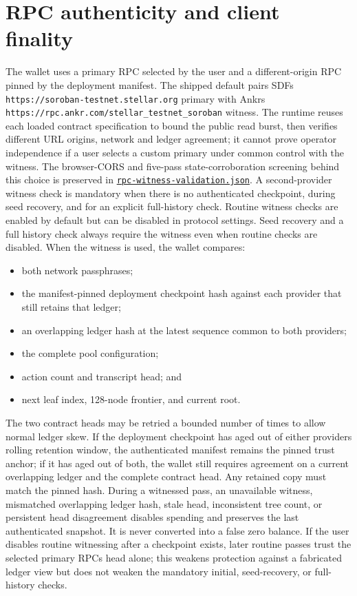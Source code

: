 \documentclass[11pt,letterpaper]{article}
\providecommand{\tightlist}{\setlength{\itemsep}{0pt}\setlength{\parskip}{0pt}}
\begin{document}
\section{RPC authenticity and client
finality}\label{rpc-authenticity-and-client-finality}

The wallet uses a primary RPC selected by the user and a
different-origin RPC pinned by the deployment manifest. The shipped
default pairs SDF\textquotesingle s
\texttt{https://soroban-testnet.stellar.org} primary with
Ankr\textquotesingle s
\texttt{https://rpc.ankr.com/stellar\_testnet\_soroban} witness. The
runtime reuses each loaded contract specification to bound the public
read burst, then verifies different URL origins, network and ledger
agreement; it cannot prove operator independence if a user selects a
custom primary under common control with the witness. The browser-CORS
and five-pass state-corroboration screening behind this choice is
preserved in
\href{https://github.com/stellarchain/io.stellarkey/blob/v1.1.2/protocol/private-balance/results/rpc-witness-validation.json}{\texttt{rpc-witness-validation.json}}.
A second-provider witness check is mandatory when there is no
authenticated checkpoint, during seed recovery, and for an explicit
full-history check. Routine witness checks are enabled by default but
can be disabled in protocol settings. Seed recovery and a full history
check always require the witness even when routine checks are disabled.
When the witness is used, the wallet compares:

\begin{itemize}
\tightlist
\item
  both network passphrases;
\item
  the manifest-pinned deployment checkpoint hash against each provider
  that still retains that ledger;
\item
  an overlapping ledger hash at the latest sequence common to both
  providers;
\item
  the complete pool configuration;
\item
  action count and transcript head; and
\item
  next leaf index, 128-node frontier, and current root.
\end{itemize}

The two contract heads may be retried a bounded number of times to allow
normal ledger skew. If the deployment checkpoint has aged out of either
provider\textquotesingle s rolling retention window, the authenticated
manifest remains the pinned trust anchor; if it has aged out of both,
the wallet still requires agreement on a current overlapping ledger and
the complete contract head. Any retained copy must match the pinned
hash. During a witnessed pass, an unavailable witness, mismatched
overlapping ledger hash, stale head, inconsistent tree count, or
persistent head disagreement disables spending and preserves the last
authenticated snapshot. It is never converted into a false zero balance.
If the user disables routine witnessing after a checkpoint exists, later
routine passes trust the selected primary RPC\textquotesingle s head
alone; this weakens protection against a fabricated ledger view but does
not weaken the mandatory initial, seed-recovery, or full-history checks.
\end{document}
